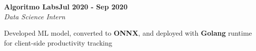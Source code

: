 \documentclass[letterpaper,10pt]{article}
\newcommand{\heading}[2]{
  \hspace{10pt}#1\hfill#2\\
}
\newcommand{\headingBf}[2]{
  \heading{\textbf{#1}}{\textbf{#2}}
}
\newcommand{\headingIt}[2]{
  \heading{\textit{#1}}{\textit{#2}}
}
\newenvironment{resume_list}{
  \vspace{-7pt}
  \begin{itemize}[itemsep=-2px, parsep=1pt, leftmargin=30pt]
}{
  \end{itemize}
}
\begin{document}


\headingBf{Algoritmo Labs}{Jul 2020 - Sep 2020}
\headingIt{Data Science Intern}{}
\begin{resume_list}
    \item Developed ML model, converted to \textbf{ONNX}, and deployed with \textbf{Golang} runtime for client-side productivity tracking
\end{resume_list}




\end{document}
